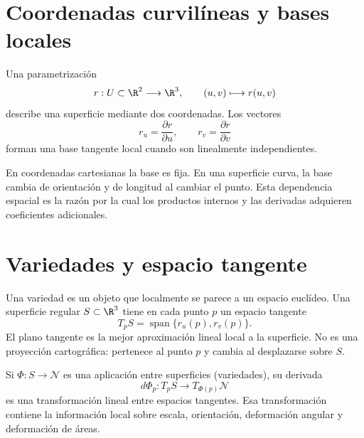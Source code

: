 \section{Coordenadas curvilíneas y bases locales}\label{cap:13}\label{sec:curvilineas}

Una parametrización
\[
  r:U\subset\R^2\longrightarrow\R^3,
  \qquad
  (u,v)\longmapsto r(u,v)
\]
describe una superficie mediante dos coordenadas. Los vectores
\[
  r_u=\frac{\partial r}{\partial u},
  \qquad
  r_v=\frac{\partial r}{\partial v}
\]
forman una base tangente local cuando son linealmente independientes.

\begin{center}
\end{center}

En coordenadas cartesianas la base es fija. En una superficie curva, la base cambia de
orientación y de longitud al cambiar el punto. Esta dependencia espacial es la razón por la
cual los productos internos y las derivadas adquieren coeficientes adicionales.

\section{Variedades y espacio tangente}\label{sec:variedades}

Una variedad es un objeto que localmente se parece a un espacio euclídeo. Una superficie
regular \(S\subset\R^3\) tiene en cada punto \(p\) un espacio tangente
\[
  T_pS=\operatorname{span}\{r_u(p),r_v(p)\}.
\]
El plano tangente es la mejor aproximación lineal local a la superficie. No es una proyección
cartográfica: pertenece al punto \(p\) y cambia al desplazarse sobre \(S\).

Si \(\Phi:S\to\mathcal N\) es una aplicación entre superficies (variedades), su derivada
\[
  d\Phi_p:T_pS\longrightarrow T_{\Phi(p)}\mathcal N
\]
es una transformación lineal entre espacios tangentes. Esa transformación contiene la
información local sobre escala, orientación, deformación angular y deformación de áreas.

